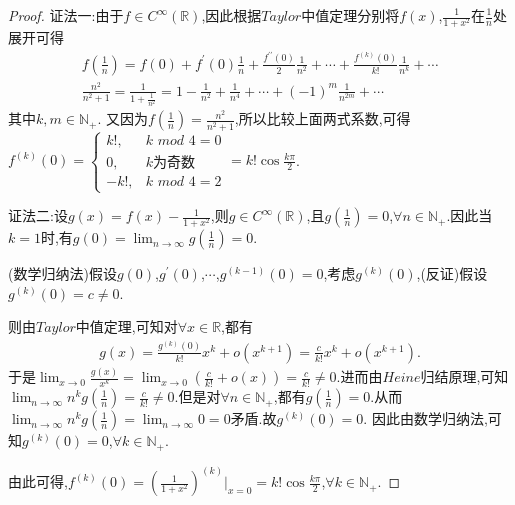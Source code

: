 \documentclass[lang=cn,newtx,10pt,scheme=chinese]{../Template/elegantbook}
\begin{document}
\begin{proof}
    {\color{blue}证法一:}由于\(f\in C^{\infty}(\mathbb{R})\),因此根据\(Taylor\)中值定理分别将\(f(x)\),\(\frac{1}{1 + x^2}\)在\(\frac{1}{n}\)处展开可得
\begin{gather*}
    f(\frac{1}{n}) = f(0) + f^{\prime}(0)\frac{1}{n} + \frac{f^{\prime\prime}(0)}{2}\frac{1}{n^2} + \cdots + \frac{f^{(k)}(0)}{k!}\frac{1}{n^k} + \cdots
    \\
    \frac{n^2}{n^2+1}=\frac{1}{1 + \frac{1}{n^2}} = 1 - \frac{1}{n^2} + \frac{1}{n^4} + \cdots + (-1)^m\frac{1}{n^{2m}} + \cdots
\end{gather*}
    其中\(k,m\in \mathbb{N}_+\).
    又因为$f\left( \frac{1}{n} \right) =\frac{n^2}{n^2+1}$,所以比较上面两式系数,可得\(f^{(k)}(0) = \begin{cases}
    k!, & k\,\,mod\,\,4 = 0\\
    0, & k\text{为奇数}\\
    -k!, & k\,\,mod\,\,4 = 2
    \end{cases} = k!\cos\frac{k\pi}{2}\).

    {\color{blue}证法二:}设\(g(x) = f(x) - \frac{1}{1 + x^2}\),则\(g\in C^{\infty}(\mathbb{R})\),且\(g(\frac{1}{n}) = 0\),\(\forall n\in \mathbb{N}_+\).因此当\(k = 1\)时,有\(g(0) = \lim_{n\rightarrow \infty}g(\frac{1}{n}) = 0\).

(数学归纳法)假设\(g(0)\),\(g^{\prime}(0)\),\(\cdots\),\(g^{(k - 1)}(0) = 0\),考虑\(g^{(k)}(0)\),(反证)假设\(g^{(k)}(0) = c\neq 0\).

则由\(Taylor\)中值定理,可知对\(\forall x\in \mathbb{R}\),都有
\begin{align*}
   g(x) = \frac{g^{(k)}(0)}{k!}x^k + o(x^{k + 1}) = \frac{c}{k!}x^k + o(x^{k + 1}).
\end{align*}
于是\(\lim_{x\rightarrow 0}\frac{g(x)}{x^k} = \lim_{x\rightarrow 0}(\frac{c}{k!} + o(x)) = \frac{c}{k!} \neq 0\).进而由\(Heine\)归结原理,可知\(\lim_{n\rightarrow \infty}n^kg(\frac{1}{n}) = \frac{c}{k!} \neq 0\).但是对\(\forall n\in \mathbb{N}_+\),都有\(g(\frac{1}{n}) = 0\).从而\(\lim_{n\rightarrow \infty}n^kg(\frac{1}{n}) = \lim_{n\rightarrow \infty}0 = 0\)矛盾.故\(g^{(k)}(0) = 0\).
因此由数学归纳法,可知\(g^{(k)}(0) = 0\),\(\forall k\in \mathbb{N}_+\).

由此可得,\(f^{(k)}(0) = (\frac{1}{1 + x^2})^{(k)}\Big|_{x = 0} = k!\cos\frac{k\pi}{2}\),\(\forall k\in \mathbb{N}_+\).
\end{proof}
\end{document}
